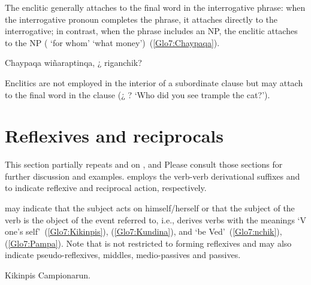 \noindent
The enclitic generally attaches to the final word in the interrogative phrase: when the interrogative pronoun completes the phrase, it attaches directly to the interrogative; in contrast, when the phrase includes an NP, the enclitic attaches to the NP ( ‘for whom’   ‘what money’)~(\ref{Glo7:Chaypaqa}).


%
{Chaypaqa wiñaraptinqa, ¿  riganchik?}%
{}%
{}{}%

Enclitics are not employed in the interior of a subordinate clause but may attach to the final word in the clause (¿    ? ‘Who did you see trample the cat?’).

\section{Reflexives and reciprocals}
This section partially repeats  and  on , and  Please consult those sections for further discussion and examples. \SYQ{} employs the verb-verb derivational suffixes  and  to indicate reflexive and reciprocal action, respectively.


\noindent
{} may indicate that the subject acts on himself/herself or that the subject of the verb is the object of the event referred to, i.e.,  derives verbs with the meanings ‘V one’s self’~(\ref{Glo7:Kikinpis}), (\ref{Glo7:Kundina}), and ‘be Ved’~(\ref{Glo7:nchik}), (\ref{Glo7:Pampa}). Note that  is not restricted to forming reflexives and may also indicate pseudo-reflexives, middles, medio-passives and passives.


%
{Kikinpis Campionarun.}%
{}%
{}{}%

